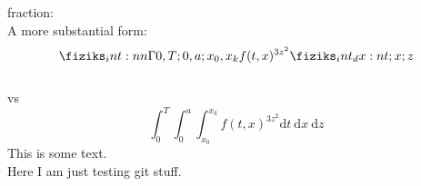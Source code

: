 
fraction: \\
\noindent
A more substantial form: \[\Int[0,T;0,a;x_0, x_k]{f(t, x)^{3z^{2}}}[t;x;z]\]\\
vs \\
\[ \int^{T}_{0} \int^{a}_{0} \int^{x_k}_{x_0} f(t,x)^{3z^2} \text{d}t\ \text{d}x\ \text{d}z \]
This is some text.\\
Here I am just testing git stuff.